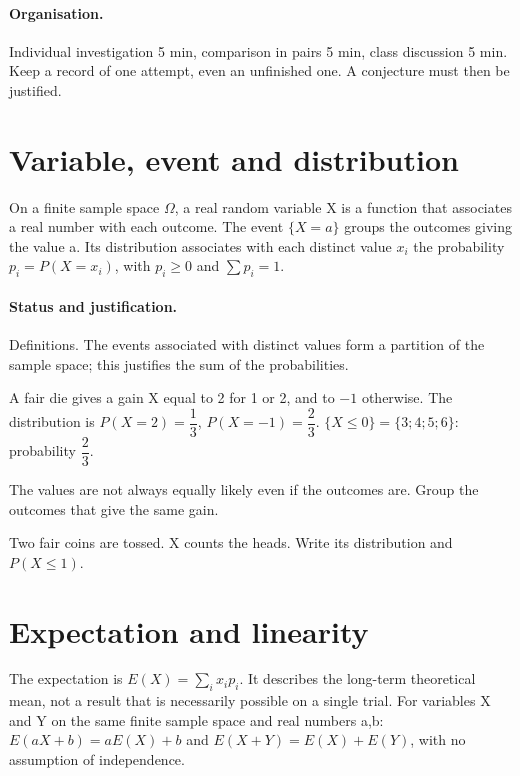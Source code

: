 \paragraph{Organisation.} Individual investigation 5 min, comparison in pairs 5 min, class discussion 5 min. Keep a record of one attempt, even an unfinished one. A conjecture must then be justified.
\section{Variable, event and distribution}\label{C08-U1}
\begin{keypoint}
On a finite sample space $\Omega$, a real random variable X is a function that associates a real number with each outcome. The event $\{X=a\}$ groups the outcomes giving the value a. Its distribution associates with each distinct value $x_i$ the probability $p_i=P(X=x_i)$, with $p_i\geq0$ and $\sum p_i=1$.
\end{keypoint}
\paragraph{Status and justification.} Definitions. The events associated with distinct values form a partition of the sample space; this justifies the sum of the probabilities.
\begin{example}A fair die gives a gain X equal to 2 for 1 or 2, and to $-1$ otherwise. The distribution is $P(X=2)=\dfrac{1}{3}$, $P(X=-1)=\dfrac{2}{3}$. $\{X\leq0\}=\{3;4;5;6\}$: probability $\dfrac{2}{3}$.\end{example}\label{C08-EX1}
\begin{pitfall}The values are not always equally likely even if the outcomes are. Group the outcomes that give the same gain.\end{pitfall}
\begin{application}Two fair coins are tossed. X counts the heads. Write its distribution and $P(X\leq1)$.\end{application}\label{C08-AP1}
\section{Expectation and linearity}\label{C08-U2}
\begin{keypoint}
The expectation is $E(X)=\sum_i x_ip_i$. It describes the long-term theoretical mean, not a result that is necessarily possible on a single trial. For variables X and Y on the same finite sample space and real numbers a,b: $E(aX+b)=aE(X)+b$ and $E(X+Y)=E(X)+E(Y)$, with no assumption of independence.
\end{keypoint}
